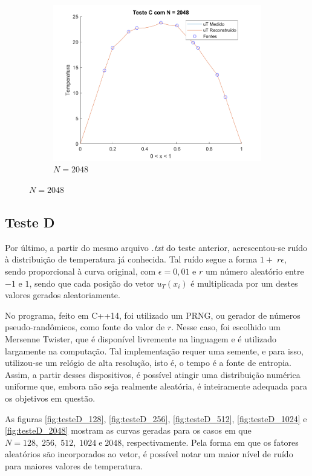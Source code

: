 \documentclass[12pt]{article}
\begin{document}
\begin{spacing}{1.5}
\begin{figure}[ht!]
\begin{subfigure}[t]{.485\linewidth}
        \includegraphics[width=1\linewidth]{Imagens/FigC2048.png}
        \caption{$N=2048$}
        \label{fig:testeC_2048}
    \end{subfigure}
\end{figure}
\subsection{Teste D}

Por último, a partir do mesmo arquivo \textit{.txt} do teste anterior, acrescentou-se ruído à distribuição de temperatura já conhecida. Tal ruído segue a forma $1 +\;r \epsilon$, sendo proporcional à curva original, com $\epsilon = 0,01$ e $r$ um número aleatório entre $-1$ e $1$, sendo que cada posição do vetor $u_T(x_i)$ é multiplicada por um destes valores gerados aleatoriamente.

No programa, feito em C++14, foi utilizado um PRNG, ou gerador de números pseudo-randômicos, como fonte do valor de $r$. Nesse caso, foi escolhido um Mersenne Twister, que é disponível livremente na linguagem\supercite{cpprandom} e é utilizado largamente na computação. Tal implementação requer uma semente, e para isso, utilizou-se um relógio de alta resolução\supercite{clock}, isto é, o tempo é a fonte de entropia. Assim, a partir desses dispositivos, é possível atingir uma distribuição numérica uniforme que, embora não seja realmente aleatória, é inteiramente adequada para os objetivos em questão.

As figuras \ref{fig:testeD_128}, \ref{fig:testeD_256}, \ref{fig:testeD_512}, \ref{fig:testeD_1024} e \ref{fig:testeD_2048} mostram as curvas geradas para os casos em que $N = 128,\;256,\;512,\;1024\;\text{e}\;2048$, respectivamente. Pela forma em que os fatores aleatórios são incorporados ao vetor, é possível notar um maior nível de ruído para maiores valores de temperatura.


\end{spacing}
\end{document}
